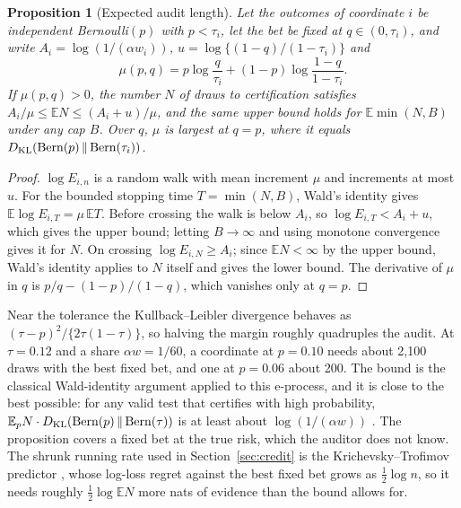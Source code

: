 \documentclass{jpc}
\newtheorem{proposition}[thm]{Proposition}
\theoremstyle{remark}
\newcommand{\E}{\mathbb E}
\begin{document}
\begin{proposition}[Expected audit length]\label{prop:length}
Let the outcomes of coordinate $i$ be independent Bernoulli$(p)$ with $p<\tau_i$, let the bet be fixed at $q\in(0,\tau_i)$, and write $A_i=\log(1/(\alpha w_i))$, $u=\log\{(1-q)/(1-\tau_i)\}$ and
\begin{equation}\label{eq:drift}
\mu(p,q)=p\log\frac q{\tau_i}+(1-p)\log\frac{1-q}{1-\tau_i}.
\end{equation}
If $\mu(p,q)>0$, the number $N$ of draws to certification satisfies $A_i/\mu\le\E N\le(A_i+u)/\mu$, and the same upper bound holds for $\E\min(N,B)$ under any cap $B$. Over $q$, $\mu$ is largest at $q=p$, where it equals $D_{\rm KL}(\mathrm{Bern}(p)\,\|\,\mathrm{Bern}(\tau_i))$.
\end{proposition}
\begin{proof}
$\log E_{i,n}$ is a random walk with mean increment $\mu$ and increments at most $u$. For the bounded stopping time $T=\min(N,B)$, Wald's identity \cite{wald1944} gives $\E\log E_{i,T}=\mu\,\E T$. Before crossing the walk is below $A_i$, so $\log E_{i,T}<A_i+u$, which gives the upper bound; letting $B\to\infty$ and using monotone convergence gives it for $N$. On crossing $\log E_{i,N}\ge A_i$; since $\E N<\infty$ by the upper bound, Wald's identity applies to $N$ itself and gives the lower bound. The derivative of $\mu$ in $q$ is $p/q-(1-p)/(1-q)$, which vanishes only at $q=p$.
\end{proof}
Near the tolerance the Kullback--Leibler divergence behaves as $(\tau-p)^2/\{2\tau(1-\tau)\}$, so halving the margin roughly quadruples the audit. At $\tau=0.12$ and a share $\alpha w=1/60$, a coordinate at $p=0.10$ needs about 2{,}100 draws with the best fixed bet, and one at $p=0.06$ about 200. The bound is the classical Wald-identity argument \cite{wald1944} applied to this e-process, and it is close to the best possible: for any valid test that certifies with high probability, $\E_pN\cdot D_{\rm KL}(\mathrm{Bern}(p)\,\|\,\mathrm{Bern}(\tau))$ is at least about $\log(1/(\alpha w))$ \cite{kaufmann2016}. The proposition covers a fixed bet at the true risk, which the auditor does not know. The shrunk running rate used in Section~\ref{sec:credit} is the Krichevsky--Trofimov predictor \cite{krichevsky1981}, whose log-loss regret against the best fixed bet grows as $\frac12\log n$, so it needs roughly $\frac12\log\E N$ more nats of evidence than the bound allows for.
\end{document}
